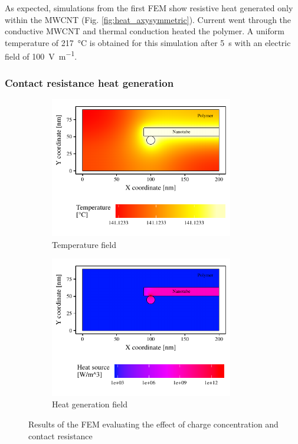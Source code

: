 \documentclass[11pt,review,times]{elsarticle}
\begin{document}
As expected, simulations from the first FEM show resistive heat generated only within the MWCNT (Fig. \ref{fig:heat_axysymmetric}). 
Current went through the conductive MWCNT and thermal conduction heated the polymer. 
A uniform temperature of \SI{217}{\celsius} is obtained for this simulation after \SI{5}{\second} with an electric field of \SI{100}{\volt\per\metre}. 

\subsubsection{Contact resistance heat generation}
	\label{subsection:mechanism2}

\begin{figure}[htb]
	\centering
	\captionsetup{width=125mm}
	\begin{subfigure}{60mm}
		\centering
		\captionsetup{width=75mm}
		\includegraphics[width=80mm]{resultats_comsol_3D_temp}
		\caption{Temperature field}
		\label{fig:temp_3D}
	\end{subfigure}
	\begin{subfigure}{80mm}
		\centering
		\captionsetup{width=75mm}
		\includegraphics[width=80mm]{resultats_comsol_3D_puissance_log}
		\caption{Heat generation field}
		\label{fig:heat_3D}
	\end{subfigure}
	\caption{Results of the FEM evaluating the effect of charge concentration and contact resistance}
	\label{fig:results_3D}
\end{figure}
\end{document}
